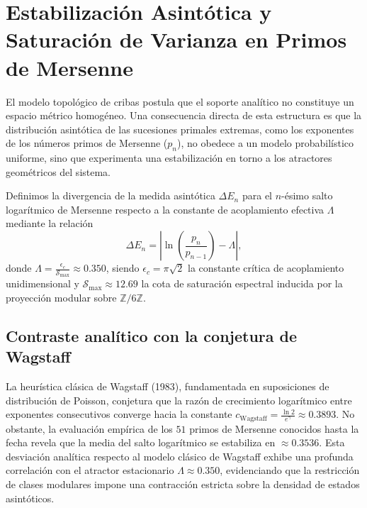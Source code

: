 \documentclass{article}
\numberwithin{equation}{section}
\theoremstyle{plain}
\theoremstyle{definition}
\begin{document}
\section{Estabilización Asintótica y Saturación de Varianza en Primos de Mersenne}
\label{sec:cristalizacion_asintotica}

El modelo topológico de cribas postula que el soporte analítico no constituye un espacio métrico homogéneo. Una consecuencia directa de esta estructura es que la distribución asintótica de las sucesiones primales extremas, como los exponentes de los números primos de Mersenne ($p_n$), no obedece a un modelo probabilístico uniforme, sino que experimenta una estabilización en torno a los atractores geométricos del sistema.

Definimos la divergencia de la medida asintótica $\Delta E_n$ para el $n$-ésimo salto logarítmico de Mersenne respecto a la constante de acoplamiento efectiva $\Lambda$ mediante la relación
\begin{equation}
    \Delta E_n = \left\lvert \ln\left(\frac{p_n}{p_{n-1}}\right) - \Lambda \right\rvert,
\end{equation}
donde $\Lambda = \frac{\epsilon_c}{\mathcal{S}_{\max}} \approx 0.350$, siendo $\epsilon_c = \pi\sqrt{2}$ la constante crítica de acoplamiento unidimensional y $\mathcal{S}_{\max} \approx 12.69$ la cota de saturación espectral inducida por la proyección modular sobre $\mathbb{Z}/6\mathbb{Z}$.

\subsection{Contraste analítico con la conjetura de Wagstaff}

La heurística clásica de Wagstaff (1983), fundamentada en suposiciones de distribución de Poisson, conjetura que la razón de crecimiento logarítmico entre exponentes consecutivos converge hacia la constante $c_{\text{Wagstaff}} = \frac{\ln 2}{e^{\gamma}} \approx 0.3893$. No obstante, la evaluación empírica de los $51$ primos de Mersenne conocidos hasta la fecha revela que la media del salto logarítmico se estabiliza en $\approx 0.3536$. Esta desviación analítica respecto al modelo clásico de Wagstaff exhibe una profunda correlación con el atractor estacionario $\Lambda \approx 0.350$, evidenciando que la restricción de clases modulares impone una contracción estricta sobre la densidad de estados asintóticos.
\end{document}
